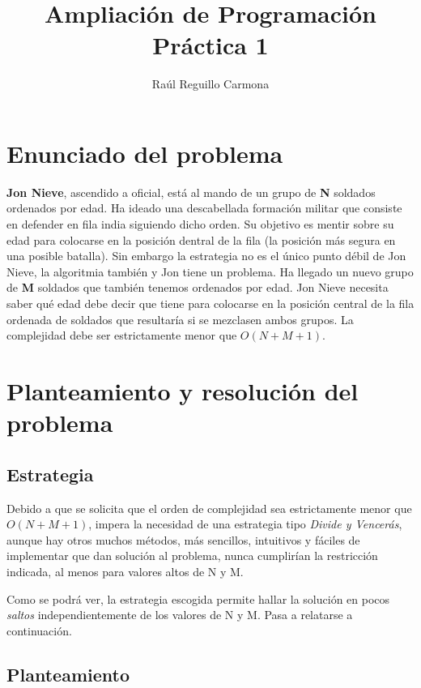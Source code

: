 \documentclass[titlepage,12pt]{article}
\title{Ampliaci\'on de Programaci\'on\\Pr\'actica 1}
\author{Ra\'ul Reguillo Carmona}
\date{}
\begin{document}
\maketitle
\newpage
\tableofcontents

\newpage

\listoffigures
\newpage

\section{Enunciado del problema}
\textbf{Jon Nieve}, ascendido a oficial, está al mando de un grupo de \textbf{N} soldados ordenados por edad. Ha ideado una descabellada formación militar que consiste en defender en fila india siguiendo dicho orden. Su objetivo es mentir sobre su edad para colocarse en la posición dentral de la fila (la posición más segura en una posible batalla). Sin embargo la estrategia no es el único punto débil de Jon Nieve, la algoritmia también y Jon tiene un problema. Ha llegado un nuevo grupo de \textbf{M} soldados que también tenemos ordenados por edad. Jon Nieve necesita saber qué edad debe decir que tiene para colocarse en la posición central de la fila ordenada de soldados que resultaría si se mezclasen ambos grupos. La complejidad debe ser estrictamente menor que \textbf{$O(N+M+1)$}. 

\section{Planteamiento y resolución del problema}

\subsection{Estrategia}

Debido a que se solicita que el orden de complejidad sea estrictamente menor que $O(N+M+1)$, impera la necesidad de una estrategia tipo \textit{Divide y Vencerás}, aunque hay otros muchos métodos, más sencillos, intuitivos y fáciles de implementar que dan solución al problema, nunca cumplirían la restricción indicada, al menos para valores altos de N y M. 

Como se podrá ver, la estrategia escogida permite hallar la solución en pocos \textit{saltos} independientemente de los valores de N y M. Pasa a relatarse a continuación.  

\subsection{Planteamiento}
\end{document}
